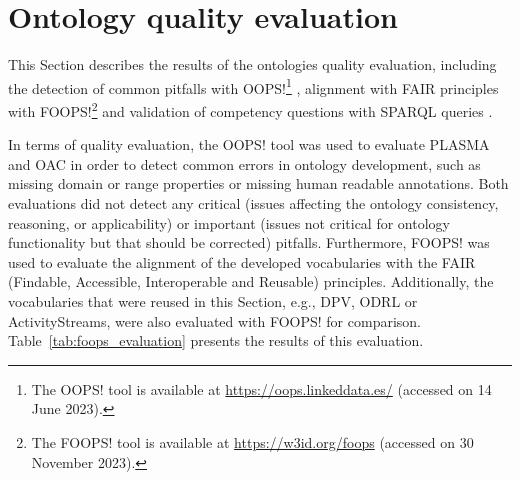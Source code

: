 \section{Ontology quality evaluation}
\label{sec:evaluation}

This Section describes the results of the ontologies quality evaluation, including the detection of common pitfalls with OOPS!\footnote{The OOPS! tool is available at \url{https://oops.linkeddata.es/} (accessed on 14 June 2023).} \citep{poveda-villalon_oops_2014}, alignment with FAIR principles with FOOPS!\footnote{The FOOPS! tool is available at \url{https://w3id.org/foops} (accessed on 30 November 2023).} \citep{garijo_foops_2021} and validation of competency questions with SPARQL queries \citep{harris_sparql_2013}.

In terms of quality evaluation, the OOPS! tool was used to evaluate PLASMA and OAC in order to detect common errors in ontology development, such as missing domain or range properties or missing human readable annotations.
Both evaluations did not detect any critical (issues affecting the ontology consistency, reasoning, or applicability) or important (issues not critical for ontology functionality but that should be corrected) pitfalls.
Furthermore, FOOPS! was used to evaluate the alignment of the developed vocabularies with the FAIR (Findable, Accessible, Interoperable and Reusable) principles.
Additionally, the vocabularies that were reused in this Section, e.g., DPV, ODRL or ActivityStreams, were also evaluated with FOOPS! for comparison.
Table~\ref{tab:foops_evaluation} presents the results of this evaluation.

\begin{table}[htp]
    \centering
    \caption{Evaluation of the alignment of the developed and reused vocabularies with FAIR principles using FOOPS!.}
    \label{tab:foops_evaluation}
\end{table}

